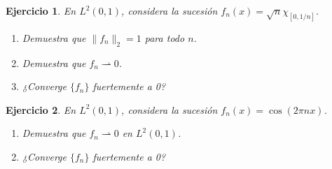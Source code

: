 \documentclass[11pt]{report}
\newtheorem{ex}{Ejercicio}
\begin{document}
\begin{ex}
  En \( L^2(0,1) \), considera la sucesión \( f_n(x) = \sqrt{n} \chi_{[0,1/n]} \).
  \begin{enumerate}
    \item Demuestra que \( \|f_n\|_2 = 1 \) para todo \( n \).
    \item Demuestra que \( f_n \rightharpoonup 0 \).
    \item ¿Converge \( \{f_n\} \) fuertemente a 0?
  \end{enumerate}

\end{ex}

\begin{ex}
  En \( L^2(0,1) \), considera la sucesión \( f_n(x) = \cos(2 \pi n x) \).
  \begin{enumerate}
    \item Demuestra que \( f_n \rightharpoonup 0 \) en \( L^2(0,1) \).
    \item ¿Converge \( \{f_n\} \) fuertemente a 0?
  \end{enumerate}

\end{ex}
\end{document}

